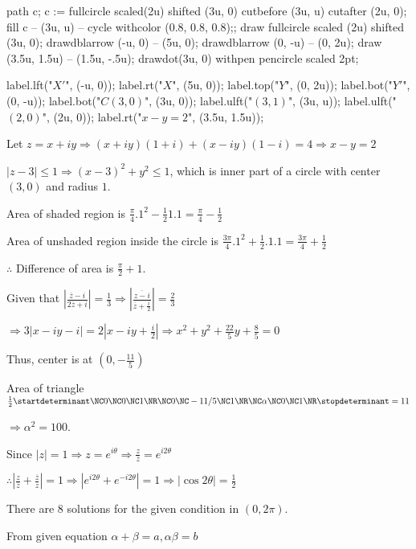       path c;
      c := fullcircle scaled(2u) shifted (3u, 0) cutbefore (3u, u) cutafter (2u, 0);
      fill c -- (3u, u) -- cycle withcolor (0.8, 0.8, 0.8);;
      draw fullcircle scaled (2u) shifted (3u, 0);
      drawdblarrow (-u, 0) -- (5u, 0);
      drawdblarrow (0, -u) -- (0, 2u);
      draw (3.5u, 1.5u) -- (1.5u, -.5u);
      drawdot(3u, 0) withpen pencircle scaled 2pt;

      label.lft("$X'$", (-u, 0));
      label.rt("$X$", (5u, 0));
      label.top("$Y$", (0, 2u));
      label.bot("$Y'$", (0, -u));
      label.bot("$C(3, 0)$", (3u, 0));
      label.ulft("$(3, 1)$", (3u, u));
      label.ulft("$(2, 0)$", (2u, 0));
      label.rt("$x - y = 2$", (3.5u, 1.5u));
    \stopMPcode
  \stopplacefigure

  Let $z = x + iy \Rightarrow (x + iy)(1 + i) + (x - iy)(1 - i) = 4\Rightarrow x - y = 2$

  $|z - 3|\leq 1\Rightarrow (x - 3)^2 + y^2\leq 1$, which is inner part of a circle with center $(3, 0)$ and
  radius $1$.

  Area of shaded region is $\frac{\pi}{4}.1^2 - \frac{1}{2}1.1 = \frac{\pi}{4} - \frac{1}{2}$

  Area of unshaded region inside the circle is $\frac{3\pi}{4}.1^2 + \frac{1}{2}.1.1 = \frac{3\pi}{4}
  + \frac{1}{2}$

  $\therefore$ Difference of area is $\frac{\pi}{2} + 1$.
\item Given that $\left|\frac{\overline{z} - i}{2\overline{z} + i}\right|
  = \frac{1}{3}\Rightarrow \left|\frac{\overline{z - i}}{\overline{z} + \frac{i}{2}}\right| = \frac{2}{3}$

  $\Rightarrow 3|x - iy - i| = 2\left|x - iy + \frac{i}{2}\right|\Rightarrow x^2 + y^2 + \frac{22}{5}y
  + \frac{8}{5} = 0$

  Thus, center is at $\left(0, -\frac{11}{5}\right)$

  Area of triangle $\frac{1}{2}\startdeterminant\NC 0\NC 0\NC 1\NR\NC 0\NC -11/5\NC 1\NR\NC \alpha\NC 0\NC
  1\NR\stopdeterminant = 11$

  $\Rightarrow \alpha^2 = 100$.
\item Since $|z| = 1 \Rightarrow z = e^{i\theta}\Rightarrow \frac{z}{\overline{z}} = e^{i2\theta}$

  $\therefore \left|\frac{z}{\overline{z}} + \frac{\overline{z}}{z}\right| =
  1\Rightarrow \left|e^{i2\theta} + e^{-i2\theta}\right| = 1\Rightarrow |\cos2\theta| = \frac{1}{2}$

  There are $8$ solutions for the given condition in $(0, 2\pi)$.
\item From given equation $\alpha + \beta = a, \alpha\beta = b$


